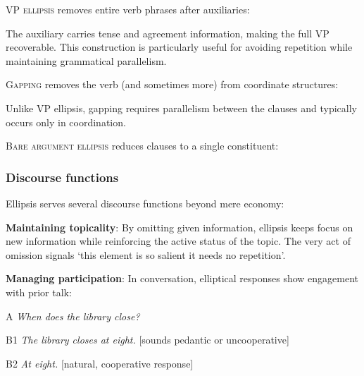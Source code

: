 \textsc{VP ellipsis} removes entire verb phrases after auxiliaries:

\ea
{}
\z
\z
The auxiliary carries tense and agreement information, making the full VP recoverable. This construction is particularly useful for avoiding repetition while maintaining grammatical parallelism.

\textsc{Gapping} removes the verb (and sometimes more) from coordinate structures:

\z
{}

Unlike VP ellipsis, gapping requires parallelism between the clauses and typically occurs only in coordination.

\textsc{Bare argument ellipsis} reduces clauses to a single constituent:

\ea
{}
\z
\z
{}

\subsubsection*{Discourse functions}

Ellipsis serves several discourse functions beyond mere economy:

\textbf{Maintaining topicality}: By omitting given information, ellipsis keeps focus on new information while reinforcing the active status of the topic. The very act of omission signals `this element is so salient it needs no repetition'.

\textbf{Managing participation}: In conversation, elliptical responses show engagement with prior talk:

\begin{dialogue}
\item[A] \textit{When does the library close?}
\item[B1] \textit{The library closes at eight.} \hfill [sounds pedantic or uncooperative]
\item[B2] \textit{At eight.} \hfill [natural, cooperative response]
\end{dialogue}

